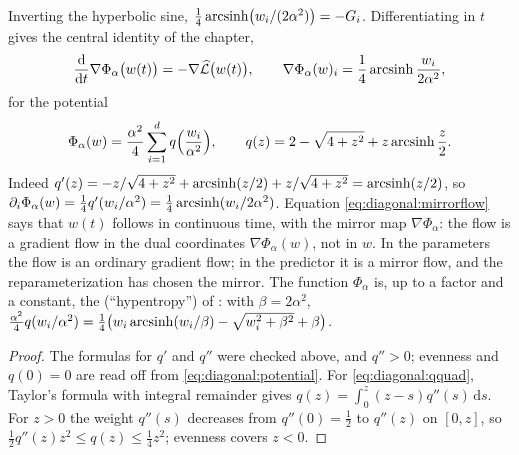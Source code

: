 \begin{refsection}
Inverting the hyperbolic sine, $\frac14\operatorname{arcsinh}\bigl(w_i/(2\alpha^2)\bigr)=-G_i$. Differentiating in $t$ gives the central identity of the chapter,
\begin{equation}\label{eq:diagonal:mirrorflow}
  \frac{\mathrm d}{\mathrm dt}\nabla\Phi_\alpha\bigl(w(t)\bigr)=-\nabla\widehat{\mathcal{L}}\bigl(w(t)\bigr),\qquad \nabla\Phi_\alpha(w)_i=\frac14\operatorname{arcsinh}\frac{w_i}{2\alpha^2},
\end{equation}
for the potential
\begin{equation}\label{eq:diagonal:potential}
  \Phi_\alpha(w)=\frac{\alpha^2}4\sum_{i=1}^dq\Bigl(\frac{w_i}{\alpha^2}\Bigr),\qquad q(z)=2-\sqrt{4+z^2}+z\operatorname{arcsinh}\frac z2 .
\end{equation}
Indeed $q'(z)=-z/\sqrt{4+z^2}+\operatorname{arcsinh}(z/2)+z/\sqrt{4+z^2}=\operatorname{arcsinh}(z/2)$, so $\partial_i\Phi_\alpha(w)=\frac14q'(w_i/\alpha^2)=\frac14\operatorname{arcsinh}(w_i/2\alpha^2)$. Equation \eqref{eq:diagonal:mirrorflow} says that $w(t)$ follows  in continuous time, with the mirror map $\nabla\Phi_\alpha$: the flow is a gradient flow in the dual coordinates $\nabla\Phi_\alpha(w)$, not in $w$. In the parameters the flow is an ordinary gradient flow; in the predictor it is a mirror flow, and the reparameterization has chosen the mirror. The function $\Phi_\alpha$ is, up to a factor and a constant, the  (``hypentropy'') of \textcite{GhaiHazanSinger2020}: with $\beta=2\alpha^2$, $\frac{\alpha^2}4q(w_i/\alpha^2)=\frac14\bigl(w_i\operatorname{arcsinh}(w_i/\beta)-\sqrt{w_i^2+\beta^2}+\beta\bigr)$.


\begin{proof}
The formulas for $q'$ and $q''$ were checked above, and $q''>0$; evenness and $q(0)=0$ are read off from \eqref{eq:diagonal:potential}. For \eqref{eq:diagonal:qquad}, Taylor's formula with integral remainder gives $q(z)=\int_0^z(z-s)q''(s)\,\mathrm ds$. For $z>0$ the weight $q''(s)$ decreases from $q''(0)=\frac12$ to $q''(z)$ on $[0,z]$, so $\frac12q''(z)z^2\le q(z)\le\frac14z^2$; evenness covers $z<0$.


\end{proof}
\end{refsection}
